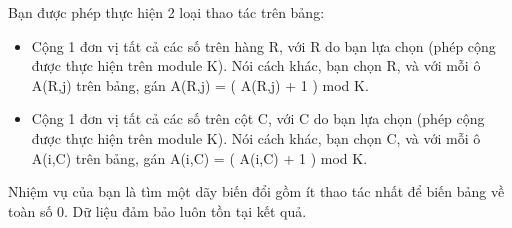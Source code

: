 Bạn được phép thực hiện 2 loại thao tác trên bảng:
\begin{itemize}
	\item Cộng 1 đơn vị tất cả các số trên hàng R, với R do bạn lựa chọn (phép cộng được thực hiện trên module K). Nói cách khác, bạn chọn R, và với mỗi ô A(R,j) trên bảng, gán A(R,j) = ( A(R,j) + 1 ) mod K.
	\item Cộng 1 đơn vị tất cả các số trên cột C, với C do bạn lựa chọn (phép cộng được thực hiện trên module K). Nói cách khác, bạn chọn C, và với mỗi ô A(i,C) trên bảng, gán A(i,C) = ( A(i,C) + 1 ) mod K.
\end{itemize}

Nhiệm vụ của bạn là tìm một dãy biến đổi gồm ít thao tác nhất để biến bảng về toàn số 0. Dữ liệu đảm bảo luôn tồn tại kết quả.